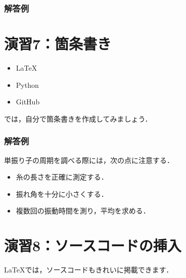 \documentclass[a4paper,twocolumn]{ltjsarticle}
\begin{document}
\subsubsection*{解答例}
\begin{table}[htbp]
    \centering
    \caption{単振り子の条件をまとめた5行7列の表}
    \label{tab:pendulum}
\end{table}

\section*{演習7：箇条書き}
\begin{itemize}
    \item LaTeX
    \item Python
    \item GitHub
\end{itemize}

では，自分で箇条書きを作成してみましょう．


\subsubsection*{解答例}
単振り子の周期を調べる際には，次の点に注意する．
\begin{itemize}
    \item 糸の長さを正確に測定する．
    \item 振れ角を十分に小さくする．
    \item 複数回の振動時間を測り，平均を求める．
\end{itemize}

\section*{演習8：ソースコードの挿入}
LaTeXでは，ソースコードもきれいに掲載できます．
\end{document}

